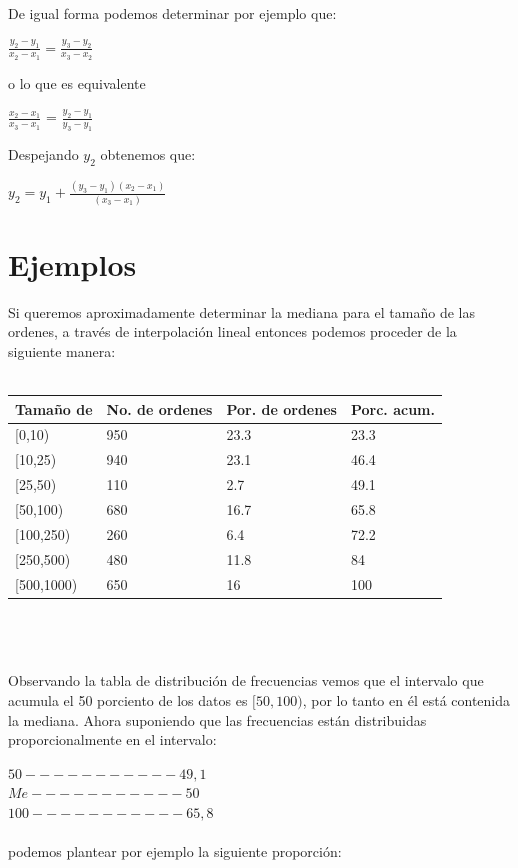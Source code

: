\documentclass{article}
\begin{document}
\begin{multicols}{2}
De igual forma podemos determinar por ejemplo que:

\begin{center}
$\frac{y_{2}-y_{1}}{x_{2}-x_{1}}=\frac{y_{3}-y_{2}}{x_{3}-x_{2}}$
\end{center}

o lo que es equivalente
\begin{center}
$\frac{x_{2}-x_{1}}{x_{3}-x_{1}}$ = $\frac{y_{2}-y_{1}}{y_{3}-y_{1}}$
\end{center}

Despejando $y_{2}$ obtenemos que:
\begin{center}
$y_{2}=y_{1}+\frac{(y_{3}-y_{1})(x_{2}-x_{1})}{(x_{3}-x_{1})}$
\end{center}

\section{Ejemplos}
\label{sec:Ejem}
Si queremos aproximadamente determinar la mediana para el tamaño de las ordenes, a través de interpolación lineal entonces podemos proceder de la siguiente manera:
\\
\\
\begin{tabular}{|l|l|l|l|}
\hline
Tamaño de & No. de ordenes & Por. de ordenes & Porc. acum. \\
\hline
[0,10) & 950 & 23.3 & 23.3 \\
\hline
[10,25) & 940 & 23.1 & 46.4 \\
\hline
[25,50) & 110 & 2.7 & 49.1 \\
\hline
[50,100) & 680 & 16.7 & 65.8\\
\hline
[100,250) & 260 & 6.4 & 72.2\\
\hline
[250,500) & 480 & 11.8 & 84 \\
\hline
[500,1000) & 650 & 16 & 100 \\
\hline
\end{tabular}
\\
\\
\\
Observando la tabla de distribución de frecuencias vemos que el intervalo que acumula el 50 porciento de los datos es $[50,100)$, por lo tanto en él está contenida la mediana.
Ahora suponiendo que las frecuencias están distribuidas proporcionalmente en el intervalo:

$50-----------49,1$
\\
$Me-----------50$
\\
$100-----------65,8$
\\
\\
podemos plantear por ejemplo la siguiente proporción:


\end{multicols}
\end{document}
